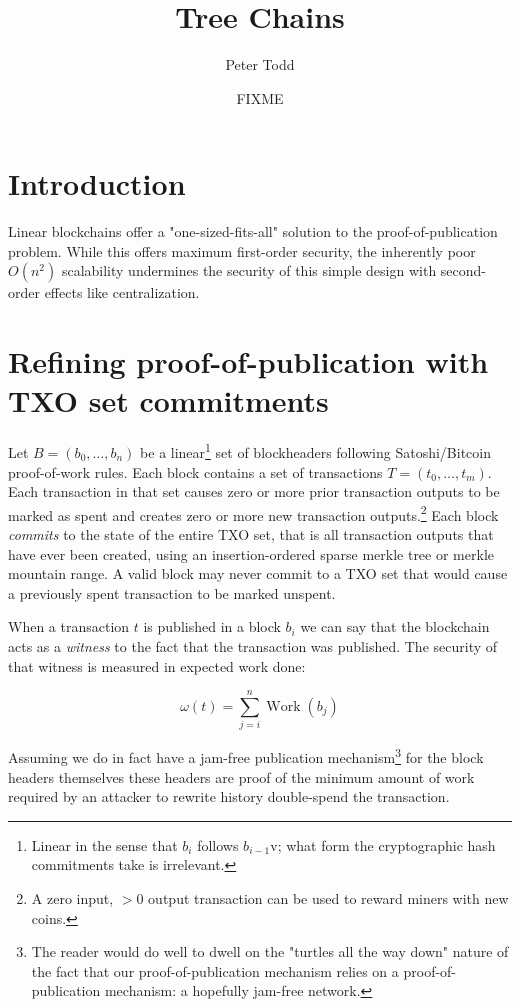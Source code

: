\documentclass{article}
\begin{document}
\title{Tree Chains}
\author{Peter Todd}
\date{FIXME}
\maketitle

\section{Introduction}

Linear blockchains offer a "one-sized-fits-all" solution to the
proof-of-publication problem. While this
offers maximum first-order security, the inherently poor $O(n^2)$ scalability
undermines the security of this simple design with second-order effects like
centralization.


\section{Refining proof-of-publication with TXO set commitments}

Let $B=(b_0,\dots,b_n)$ be a linear\footnote{Linear in the sense that $b_i$
follows $b_{i-1}$v; what form the cryptographic hash commitments take is
irrelevant.} set of blockheaders following Satoshi/Bitcoin proof-of-work
rules.\cite{bitcoin-paper} Each block contains a set of transactions
$T=(t_0,\dots,t_m)$. Each transaction in that set causes zero or more prior
transaction outputs to be marked as spent and creates zero or more new
transaction outputs.\footnote{A zero input, $>0$ output transaction can be used
to reward miners with new coins.} Each block \emph{commits} to the state of the
entire TXO set, that is all transaction outputs that have ever been created,
using an insertion-ordered sparse merkle
tree\cite{revocation-transparency-sparse-merkle-tree} or merkle mountain range.
A valid block may never commit to a TXO set that would cause a previously spent
transaction to be marked unspent.

When a transaction $t$ is published in a block $b_i$ we can say that the
blockchain acts as a \emph{witness} to the fact that the transaction was
published. The security of that witness is measured in expected work done:

\begin{equation}
    \omega(t) = \sum_{j=i}^n \operatorname{Work}(b_j)
\end{equation}

Assuming we do in fact have a jam-free publication mechanism\footnote{The
reader would do well to dwell on the "turtles all the way down" nature of the
fact that our proof-of-publication mechanism relies on a proof-of-publication
mechanism: a hopefully jam-free network.} for the block headers themselves
these headers are proof of the minimum amount of work required by an attacker
to rewrite history double-spend the transaction.
\end{document}
